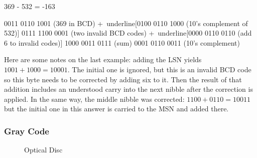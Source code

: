 \begin{minipage}{\linewidth} %

\begin{binDisp}[commandchars=~\[\]]

    369 - 532 = -163

          0011 0110 1001  (369 in BCD)
         +~underline[0100 0110 1000  (10's complement of 532)]
          0111 1100 0001  (two invalid BCD codes)
         +~underline[0000 0110 0110  (add 6 to invalid codes)]
          1000 0011 0111  (sum)
          0001 0110 0011  (10's complement)

\end{binDisp}
\end{minipage}

Here are some notes on the last example: adding the \ac{LSN} yields $ 1001+1000=10001 $. The initial one is ignored, but this is an invalid \ac{BCD} code so this byte needs to be corrected by adding six to it. Then the result of that addition includes an understood carry into the next nibble after the correction is applied. In the same way, the middle nibble was corrected: $ 1100+0110=10011 $ but the initial one in this answer is carried to the \ac{MSN} and added there.

\subsubsection{Gray Code}
\label{MO:subsub:gray_code}

\begin{wrapfigure}{r}{0.3\textwidth}
  \caption{Optical Disc}
  \label{MO:fig:gray_code_disc}
  \centering

  \xdef\IntRad{2}
  \xdef\Rad{.5}

  \newcommand{\Sector}[2][]{%
    \draw[#1] (22.5:#2) arc (22.5:0:#2)
    --(#2+\Rad,0) arc (0:22.5:#2+\Rad)
    -- cycle ;
  }

\end{wrapfigure}

